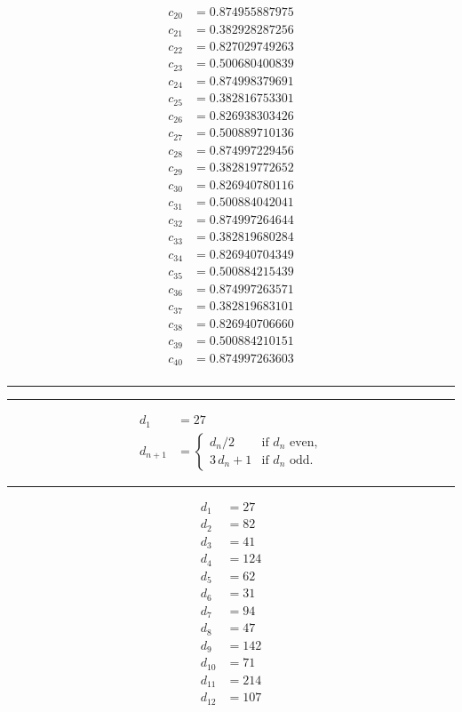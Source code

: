 \documentclass[10pt,letterpaper]{article}
\begin{document}
\begin{multicols}{4}
\begin{align*}
c_{20} &= 0.874955887975 \\
c_{21} &= 0.382928287256 \\
c_{22} &= 0.827029749263 \\
c_{23} &= 0.500680400839 \\
c_{24} &= 0.874998379691 \\
c_{25} &= 0.382816753301 \\
c_{26} &= 0.826938303426 \\
c_{27} &= 0.500889710136 \\
c_{28} &= 0.874997229456 \\
c_{29} &= 0.382819772652 \\
c_{30} &= 0.826940780116 \\
c_{31} &= 0.500884042041 \\
c_{32} &= 0.874997264644 \\
c_{33} &= 0.382819680284 \\
c_{34} &= 0.826940704349 \\
c_{35} &= 0.500884215439 \\
c_{36} &= 0.874997263571 \\
c_{37} &= 0.382819683101 \\
c_{38} &= 0.826940706660 \\
c_{39} &= 0.500884210151 \\
c_{40} &= 0.874997263603 \\
\end{align*}
\vfill
\columnbreak
\hrule
\hrule
\begin{align*}
d_1 &= 27 \\
d_{n+1} &= \begin{cases}
d_n/2 & \mbox{if $d_n$ even,} \\
3\,d_n + 1 & \mbox{if $d_n$ odd.}
\end{cases}
\end{align*}
\hrule
\begin{align*}
d_{1} &= 27 \\
d_{2} &= 82 \\
d_{3} &= 41 \\
d_{4} &= 124 \\
d_{5} &= 62 \\
d_{6} &= 31 \\
d_{7} &= 94 \\
d_{8} &= 47 \\
d_{9} &= 142 \\
d_{10} &= 71 \\
d_{11} &= 214 \\
d_{12} &= 107 \\

\end{align*}
\end{multicols}
\end{document}
